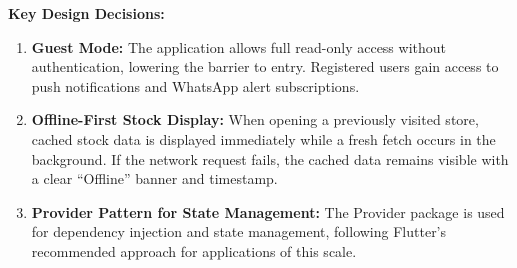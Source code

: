 \textbf{Key Design Decisions:}

\begin{enumerate}
    \item \textbf{Guest Mode:} The application allows full read-only access without authentication, lowering the barrier to entry. Registered users gain access to push notifications and WhatsApp alert subscriptions.

    \item \textbf{Offline-First Stock Display:} When opening a previously visited store, cached stock data is displayed immediately while a fresh fetch occurs in the background. If the network request fails, the cached data remains visible with a clear ``Offline'' banner and timestamp.

    \item \textbf{Provider Pattern for State Management:} The Provider package is used for dependency injection and state management, following Flutter's recommended approach for applications of this scale.
\end{enumerate}